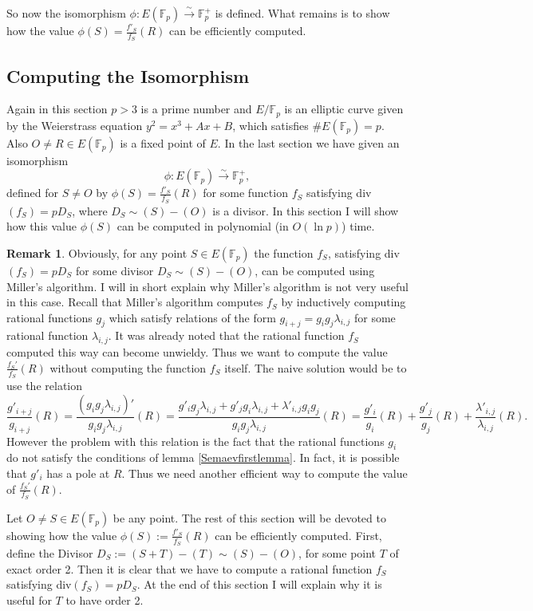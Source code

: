 \documentclass{article}
\numberwithin{equation}{section}
\theoremstyle{definition}
\newtheorem{remark}[theorem]{Remark}
\newcommand{\FF}[1]{{\mathbb F}_{#1}} %
\begin{document}
So now the isomorphism $\phi:E(\FF{p}) \overset{\sim}{\rightarrow} \FF{p}^+$ is defined. What remains is to show how the value $\phi(S)=\frac{f'_S}{f_S}(R)$ can be efficiently computed. 




\subsection{Computing the Isomorphism}
Again in this section $p>3$ is a prime number and $E/\FF{p}$ is an elliptic curve given by the Weierstrass equation $y^2=x^3+Ax+B$, which satisfies $\#E(\FF{p})=p$. Also $O \neq R\in E(\FF{p})$ is a fixed point of $E$. In the last section we have given an isomorphism $$\phi:E(\FF{p}) \overset{\sim}{\rightarrow}\FF{p}^+,$$ defined for $S\neq O$ by $\phi(S)=\frac{f'_S}{f_S}(R)$ for some function $f_S$ satisfying div$(f_S)=pD_S$, where $D_S\sim(S)-(O)$ is a divisor. In this section I will show how this value $\phi(S)$ can be computed in polynomial (in $O(\ln p)$) time. 

\begin{remark}
Obviously, for any point $S\in E(\FF{p})$ the function $f_S$, satisfying div$(f_S)=pD_S$ for some divisor $D_S \sim (S)-(O)$, can be computed using Miller's algorithm. I will in short explain why Miller's algorithm is not very useful in this case. Recall that Miller's algorithm computes $f_S$ by inductively computing rational functions $g_j$ which satisfy relations of the form $g_{i+j}=g_ig_j\lambda_{i,j}$ for some rational function $\lambda_{i,j}$. It was already noted that the rational function $f_S$ computed this way can become unwieldy. Thus we want to compute the value $\frac{f_S'}{f_S}(R)$ without computing the function $f_S$ itself. The naive solution would be to use the relation $$\frac{g'_{i+j}}{g_{i+j}}(R)=\frac{(g_ig_j\lambda_{i,j})'}{g_ig_j\lambda_{i,j}}(R)= \frac{g'_ig_j\lambda_{i,j}+g'_jg_i\lambda_{i,j}+\lambda'_{i,j}g_ig_j}{g_ig_j\lambda_{i,j}}(R)=\frac{g'_i}{g_i}(R)+\frac{g'_j}{g_j}(R)+\frac{\lambda'_{i,j}}{\lambda_{i,j}}(R).$$ However the problem with this relation is the fact that the rational functions $g_i$ do not satisfy the conditions of lemma \ref{Semaevfirstlemma}. In fact, it is possible that $g'_i$ has a pole at $R$. Thus we need another efficient way to compute the value of $\frac{f_S'}{f_S}(R)$. 
\end{remark}

Let $O \neq S\in E(\FF{p})$ be any point. The rest of this section will be devoted to showing how the value $\phi(S):=\frac{f'_S}{f_S}(R)$ can be efficiently computed. First, define the Divisor $D_S:=(S+T)-(T) \sim (S)-(O)$, for some point $T$ of exact order 2. Then it is clear that we have to compute a rational function $f_S$ satisfying div$(f_S)=pD_S$. At the end of this section I will explain why it is useful for $T$ to have order 2.
\end{document}
